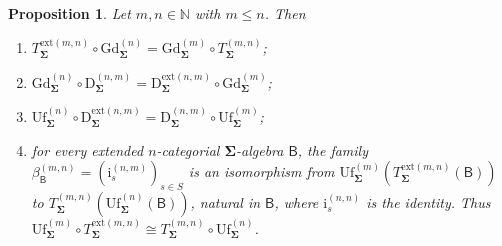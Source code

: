 \documentclass{amsart}
\theoremstyle{plain}
\newtheorem{proposition}[theorem]{Proposition}
\theoremstyle{definition}
\begin{document}
\begin{proposition}\label{PCompatGdUf}
Let $m,n\in\mathbb{N}$ with $m\leq n$. Then
\begin{enumerate}
\item $T^{\mathrm{ext}(m,n)}_{\mathbf{\Sigma}}\circ\mathrm{Gd}^{(n)}_{\mathbf{\Sigma}}=\mathrm{Gd}^{(m)}_{\mathbf{\Sigma}}\circ T^{(m,n)}_{\mathbf{\Sigma}}$;
\item $\mathrm{Gd}^{(n)}_{\mathbf{\Sigma}}\circ\mathrm{D}^{(n,m)}_{\mathbf{\Sigma}}=\mathrm{D}^{\mathrm{ext}(n,m)}_{\mathbf{\Sigma}}\circ\mathrm{Gd}^{(m)}_{\mathbf{\Sigma}}$;
\item $\mathrm{Uf}^{(n)}_{\mathbf{\Sigma}}\circ\mathrm{D}^{\mathrm{ext}(n,m)}_{\mathbf{\Sigma}}=\mathrm{D}^{(n,m)}_{\mathbf{\Sigma}}\circ\mathrm{Uf}^{(m)}_{\mathbf{\Sigma}}$;
\item for every extended $n$-categorial $\mathbf{\Sigma}$-algebra $\boldsymbol{\mathsf{B}}$, the family $\beta^{(m,n)}_{\boldsymbol{\mathsf{B}}}=(\mathrm{i}^{(n,m)}_{s})_{s\in S}$ is an isomorphism from $\mathrm{Uf}^{(m)}_{\mathbf{\Sigma}}(T^{\mathrm{ext}(m,n)}_{\mathbf{\Sigma}}(\boldsymbol{\mathsf{B}}))$ to $T^{(m,n)}_{\mathbf{\Sigma}}(\mathrm{Uf}^{(n)}_{\mathbf{\Sigma}}(\boldsymbol{\mathsf{B}}))$, natural in $\boldsymbol{\mathsf{B}}$, where $\mathrm{i}^{(n,n)}_{s}$ is the identity. Thus $\mathrm{Uf}^{(m)}_{\mathbf{\Sigma}}\circ T^{\mathrm{ext}(m,n)}_{\mathbf{\Sigma}}\cong T^{(m,n)}_{\mathbf{\Sigma}}\circ\mathrm{Uf}^{(n)}_{\mathbf{\Sigma}}$.
\end{enumerate}
\end{proposition}
\end{document}
